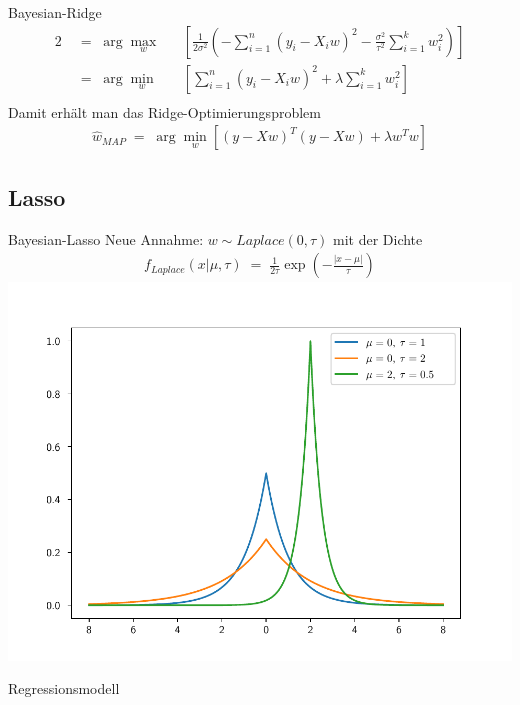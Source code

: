 \documentclass{beamer}
\begin{document}
{\begin{frame}{Bayesian-Ridge}
	\begin{alignat}{2}
		&\;=\;\arg\underset{w}{\max} && \left[\frac{1}{2\sigma^2}\left(-\sum_{i=1}^{n}\left(y_i-X_iw\right)^2-\frac{\sigma^2}{\tau^2}\sum_{i=1}^{k}w_i^2\right)\right]\\
		&\;=\;\arg\underset{w}{\min} && \left[\sum_{i=1}^{n}\left(y_i-X_iw\right)^2+\lambda\sum_{i=1}^{k}w_i^2\right] \\
	\end{alignat}
	Damit erhält man das Ridge-Optimierungsproblem
	\begin{align}
		\hat{w}_{MAP}\;=\;\arg\underset{w}{\min}\left[\left(y-Xw\right)^T\left(y-Xw\right)+\lambda w^Tw\right]
	\end{align}
\end{frame}

\subsection{Lasso}

\begin{frame}{Bayesian-Lasso}
	Neue Annahme: $w\sim Laplace(0, \tau)$ mit der Dichte
	\begin{align}
		f_{Laplace}(x|\mu,\tau)\;=\;\frac{1}{2\tau}\exp\left(-\frac{\left|x-\mu\right|}{\tau}\right)
	\end{align}
	\centering\includegraphics[scale=0.45]{laplacedens.pdf}
\end{frame}

\begin{frame}{Regressionsmodell}
	\centering
\end{frame}}
\end{document}
